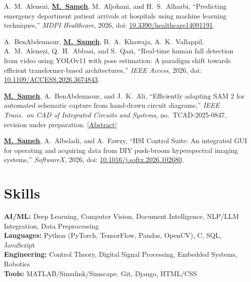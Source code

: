 \documentclass[a4paper,11pt]{article}
\begin{document}
\begin{enumerate}[leftmargin=1.5em, itemsep=4pt, parsep=0pt, topsep=2pt, label={[\arabic*]}]

    \item A.\ M.\ Alenezi, \underline{\textbf{M.\ Sameh}}, M.\ Aljohani, and H.\ S.\ Alharbi, ``Predicting emergency department patient arrivals at hospitals using machine learning techniques,'' \textit{MDPI Healthcare}, 2026, doi: \href{https://doi.org/10.3390/healthcare14091191}{10.3390/healthcare14091191}.

    \item A.\ BenAbdennour, \underline{\textbf{M.\ Sameh}}, B.\ A.\ Khawaja, A.\ K.\ Vallappil, A.\ M.\ Alenezi, Q.\ H.\ Abbasi, and S.\ Qazi, ``Real-time human fall detection from video using YOLOv11 with pose estimation: A paradigm shift towards efficient transformer-based architectures,'' \textit{IEEE Access}, 2026, doi: \href{https://doi.org/10.1109/ACCESS.2026.3674843}{10.1109/ACCESS.2026.3674843}.

    \item \underline{\textbf{M.\ Sameh}}, A.\ BenAbdennour, and J.\ K.\ Ali, ``Efficiently adapting SAM 2 for automated schematic capture from hand-drawn circuit diagrams,'' \textit{IEEE Trans.\ on CAD of Integrated Circuits and Systems}, no.\ TCAD-2025-0847, revision under preparation. [\href{https://docs.google.com/document/d/1F6Xp7tv1xqBt4ojfr0OUyZ-czaBAweY8-Oc1IMQmPW4/edit?usp=sharing}{Abstract}]

    \item \underline{\textbf{M.\ Sameh}}, A.\ Albeladi, and A.\ Fawzy, ``HSI Control Suite: An integrated GUI for operating and acquiring data from DIY push-broom hyperspectral imaging systems,'' \textit{SoftwareX}, 2026, doi: \href{https://doi.org/10.1016/j.softx.2026.102680}{10.1016/j.softx.2026.102680}.

\end{enumerate}

\section{Skills}

\textbf{AI/ML:} Deep Learning, Computer Vision, Document Intelligence, NLP/LLM Integration, Data Preprocessing \\
\textbf{Languages:} Python (PyTorch, TensorFlow, Pandas, OpenCV), C, SQL, JavaScript \\
\textbf{Engineering:} Control Theory, Digital Signal Processing, Embedded Systems, Robotics \\
\textbf{Tools:} MATLAB/Simulink/Simscape, Git, Django, HTML/CSS
\end{document}
